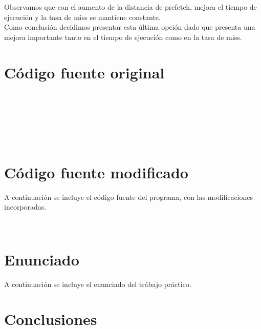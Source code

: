 \documentclass[a4paper,10pt]{article}
\begin{document}
Observamos que con el aumento de la distancia de prefetch, mejora el tiempo de ejecuci\'on y la tasa de miss se mantiene constante.\\

Como conclusi\'on decidimos presentar esta \'ultima opci\'on dado que presenta una mejora importante tanto en el tiempo de ejecuci\'on como en la tasa de miss.











\pagebreak
\section{C\'odigo fuente original} 
\begin{verbatim}


 



\end{verbatim}

\pagebreak
\section{C\'odigo fuente modificado} 

A continuaci\'on se incluye el c\'odigo fuente del programa, con las modificaciones incorporadas.

\begin{verbatim}


\end{verbatim}



\pagebreak

\section{Enunciado} 

A continuaci\'on se incluye el enunciado del tr\'abajo pr\'actico.
\pagebreak

\section{Conclusiones}
\end{document}
